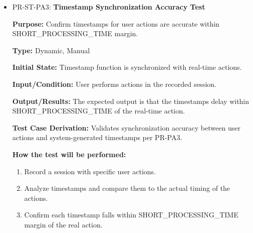 \documentclass[12pt, titlepage]{article}
\begin{document}
\begin{itemize}
  \item PR-ST-PA3: \textbf{Timestamp Synchronization Accuracy Test}
    \begin{mdframed}[linewidth=0.5mm]
      \textbf{Purpose:} Confirm timestamps for user actions are accurate within \\ SHORT\_PROCESSING\_TIME margin. \par
      \textbf{Type:} Dynamic, Manual \par
      \textbf{Initial State:} Timestamp function is synchronized with real-time actions. \par
      \textbf{Input/Condition:} User performs actions in the recorded session. \par
      \textbf{Output/Results:} The expected output is that the timestamps delay within SHORT\_PROCESSING\_TIME of the real-time action. \par
      \textbf{Test Case Derivation:} Validates synchronization accuracy between user actions and system-generated timestamps per PR-PA3. \par
      \textbf{How the test will be performed:}
      \begin{enumerate}[noitemsep]
        \item Record a session with specific user actions.
        \item Analyze timestamps and compare them to the actual timing of the actions.
        \item Confirm each timestamp falls within SHORT\_PROCESSING\_TIME margin of the real action.
      \end{enumerate}
  \end{mdframed}


\end{itemize}
\end{document}

